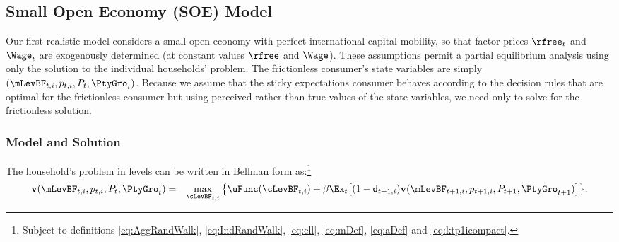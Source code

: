\documentclass[titlepage]{\econtex}\newcommand{\texname}{cAndCwithStickyE}
\begin{document}
\subsection{Small Open Economy (SOE) Model}

Our first realistic model considers a small open economy with perfect international capital mobility, so that factor prices $\rfree_t$ and $\Wage_t$ are exogenously determined (at constant values $\rfree$ and $\Wage$).  These assumptions permit a partial equilibrium analysis using only the solution to the individual households' problem. The frictionless consumer's state variables are simply $(\mLevBF_{t,i},p_{t,i},P_t,\PtyGro_t)$.  Because we assume that the sticky expectations consumer behaves according to the decision rules that are optimal for the frictionless consumer but using perceived rather than true values of the state variables, we need only to solve for the frictionless solution.

\subsubsection{Model and Solution}

The household's problem in levels can be written in Bellman form as:\footnote{Subject to definitions \eqref{eq:AggRandWalk}, \eqref{eq:IndRandWalk}, \eqref{eq:ell}, \eqref{eq:mDef}, \eqref{eq:aDef} and \eqref{eq:ktp1icompact}.}
\begin{eqnarray}
\textbf{v}(\mLevBF_{t,i},p_{t,i},P_t,\PtyGro_t)  & = &  \max_{\cLevBF_{t,i}}  \big\{ \uFunc(\cLevBF_{t,i}) + \beta \Ex_t \big[(1-\pDies_{t+1,i})\textbf{v}(\mLevBF_{t+1,i},p_{t+1,i},P_{t+1},\PtyGro_{t+1})\big] \big\}. \nonumber \\ \label{eq:SOEproblem}
\end{eqnarray}
\end{document}
